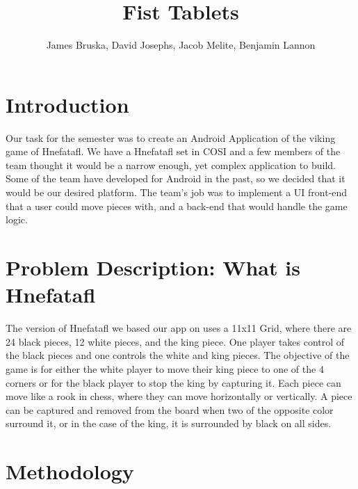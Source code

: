 \documentclass{article}
\title{Fist Tablets}
\author{James Bruska, David Josephs, Jacob Melite, Benjamin Lannon}
\begin{document}
\maketitle
\tableofcontents


\section{Introduction}
	Our task for the semester was to create an Android Application of the viking game of Hnefatafl. We have a Hnefatafl set in COSI and a few members of the team thought it would be a narrow enough, yet complex application to build. Some of the team have developed for Android in the past, so we decided that it would be our desired platform. The team's job was to implement a UI front-end that a user could move pieces with, and a back-end that would handle the game logic.

\section{Problem Description: What is Hnefatafl}
	The version of Hnefatafl we based our app on uses a 11x11 Grid, where there are 24 black pieces, 12 white pieces, and the king piece. One player takes control of the black pieces and one controls the white and king pieces. The objective of the game is for either the white player to move their king piece to one of the 4 corners or for the black player to stop the king by capturing it. Each piece can move like a rook in chess, where they can move horizontally or vertically. A piece can be captured and removed from the board when two of the opposite color surround it, or in the case of the king, it is surrounded by black on all sides.

\section{Methodology}
\end{document}
